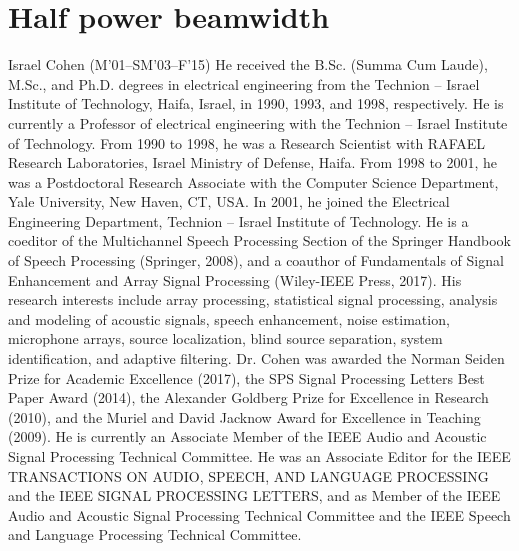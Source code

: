 \documentclass[journal]{IEEEtran}
\begin{document}
\section{Half power beamwidth}
\label{apdx_HPBW}

\ifCLASSOPTIONcaptionsoff
  \newpage
\fi

\begin{IEEEbiography}{Israel Cohen}
(M’01–SM’03–F’15) He received the B.Sc. (Summa Cum Laude), M.Sc., and Ph.D. degrees in electrical engineering from the Technion – Israel Institute of Technology, Haifa, Israel, in 1990, 1993, and 1998, respectively.
He is currently a Professor of electrical engineering with the Technion – Israel Institute of Technology.
From 1990 to 1998, he was a Research Scientist with RAFAEL Research Laboratories, Israel Ministry of Defense, Haifa. 
From 1998 to 2001, he was a Postdoctoral Research Associate with the Computer Science Department, Yale University, New Haven, CT, USA. In 2001, he joined the Electrical Engineering Department, Technion – Israel Institute of Technology.
He is a coeditor of the Multichannel Speech Processing Section of the Springer Handbook of Speech Processing (Springer, 2008), and a coauthor of Fundamentals of Signal Enhancement and Array Signal Processing (Wiley-IEEE Press, 2017). 
His research interests include array processing, statistical signal processing, analysis and modeling of acoustic signals, speech enhancement, noise estimation, microphone arrays, source localization, blind source separation, system identification, and adaptive filtering.
Dr. Cohen was awarded the Norman Seiden Prize for Academic Excellence (2017), the SPS Signal Processing Letters Best Paper Award (2014), the Alexander Goldberg Prize for Excellence in Research (2010), and the Muriel and David Jacknow Award for Excellence in Teaching (2009). 
He is currently an Associate Member of the IEEE Audio and Acoustic Signal Processing Technical Committee. 
He was an Associate Editor for the IEEE TRANSACTIONS ON AUDIO, SPEECH, AND LANGUAGE PROCESSING and the IEEE SIGNAL PROCESSING LETTERS, and as Member of the IEEE Audio and Acoustic Signal Processing
Technical Committee and the IEEE Speech and Language Processing Technical Committee.
\end{IEEEbiography}
\end{document}
